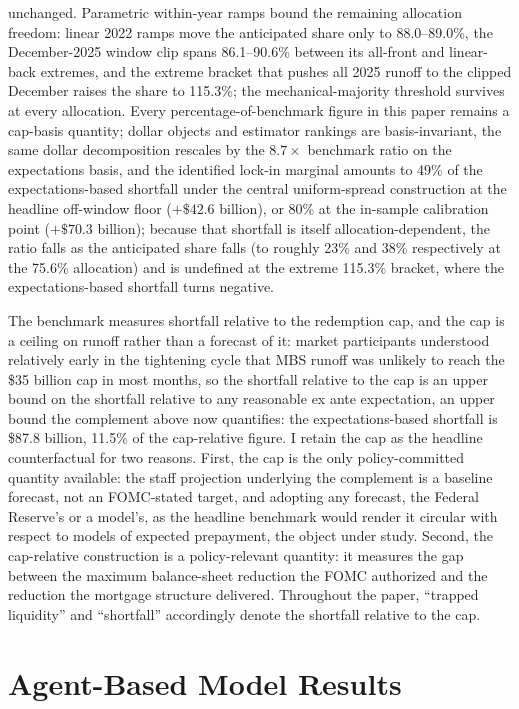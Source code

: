 \documentclass[12pt]{article}
\begin{document}
unchanged. Parametric within-year ramps bound the remaining allocation freedom: linear 2022 ramps move the anticipated share only to 88.0--89.0\%, the December-2025 window clip spans 86.1--90.6\% between its all-front and linear-back extremes, and the extreme bracket that pushes all 2025 runoff to the clipped December raises the share to 115.3\%; the mechanical-majority threshold survives at every allocation. Every percentage-of-benchmark figure in this paper remains a cap-basis quantity; dollar objects and estimator rankings are basis-invariant, the same dollar decomposition rescales by the $8.7\times$ benchmark ratio on the expectations basis, and the identified lock-in marginal amounts to 49\% of the expectations-based shortfall under the central uniform-spread construction at the headline off-window floor ($+\$42.6$ billion), or 80\% at the in-sample calibration point ($+\$70.3$ billion); because that shortfall is itself allocation-dependent, the ratio falls as the anticipated share falls (to roughly 23\% and 38\% respectively at the 75.6\% allocation) and is undefined at the extreme 115.3\% bracket, where the expectations-based shortfall turns negative.

The benchmark measures shortfall relative to the redemption cap, and the cap is a ceiling on runoff rather than a forecast of it: market participants understood relatively early in the tightening cycle that MBS runoff was unlikely to reach the \$35 billion cap in most months, so the shortfall relative to the cap is an upper bound on the shortfall relative to any reasonable ex ante expectation, an upper bound the complement above now quantifies: the expectations-based shortfall is \$87.8 billion, 11.5\% of the cap-relative figure. I retain the cap as the headline counterfactual for two reasons. First, the cap is the only policy-committed quantity available: the staff projection underlying the complement is a baseline forecast, not an FOMC-stated target, and adopting any forecast, the Federal Reserve's or a model's, as the headline benchmark would render it circular with respect to models of expected prepayment, the object under study. Second, the cap-relative construction is a policy-relevant quantity: it measures the gap between the maximum balance-sheet reduction the FOMC authorized and the reduction the mortgage structure delivered. Throughout the paper, ``trapped liquidity'' and ``shortfall'' accordingly denote the shortfall relative to the cap.

\section{Agent-Based Model Results}\label{sec:abm}
\end{document}
